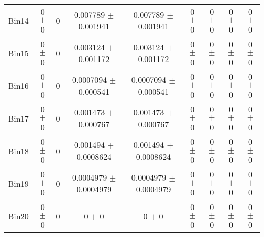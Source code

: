 \begin{tabular}{@{\extracolsep{4pt}}lcccccccc@{}}
     Bin14 & 0 $\pm$ 0 & 0 & 0.007789 $\pm$ 0.001941 & 0.007789 $\pm$ 0.001941 & 0 $\pm$ 0 & 0 $\pm$ 0 & 0 $\pm$ 0 & 0 $\pm$ 0 \\ 
     Bin15 & 0 $\pm$ 0 & 0 & 0.003124 $\pm$ 0.001172 & 0.003124 $\pm$ 0.001172 & 0 $\pm$ 0 & 0 $\pm$ 0 & 0 $\pm$ 0 & 0 $\pm$ 0 \\ 
     Bin16 & 0 $\pm$ 0 & 0 & 0.0007094 $\pm$ 0.000541 & 0.0007094 $\pm$ 0.000541 & 0 $\pm$ 0 & 0 $\pm$ 0 & 0 $\pm$ 0 & 0 $\pm$ 0 \\ 
     Bin17 & 0 $\pm$ 0 & 0 & 0.001473 $\pm$ 0.000767 & 0.001473 $\pm$ 0.000767 & 0 $\pm$ 0 & 0 $\pm$ 0 & 0 $\pm$ 0 & 0 $\pm$ 0 \\ 
     Bin18 & 0 $\pm$ 0 & 0 & 0.001494 $\pm$ 0.0008624 & 0.001494 $\pm$ 0.0008624 & 0 $\pm$ 0 & 0 $\pm$ 0 & 0 $\pm$ 0 & 0 $\pm$ 0 \\ 
     Bin19 & 0 $\pm$ 0 & 0 & 0.0004979 $\pm$ 0.0004979 & 0.0004979 $\pm$ 0.0004979 & 0 $\pm$ 0 & 0 $\pm$ 0 & 0 $\pm$ 0 & 0 $\pm$ 0 \\ 
     Bin20 & 0 $\pm$ 0 & 0 & 0 $\pm$ 0 & 0 $\pm$ 0 & 0 $\pm$ 0 & 0 $\pm$ 0 & 0 $\pm$ 0 & 0 $\pm$ 0 \\ 
\hline\hline
  \end{tabular}
